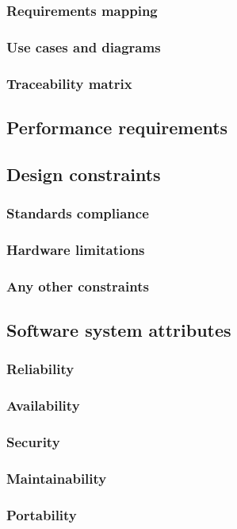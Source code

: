 \documentclass[11pt,twoside]{article}
\begin{document}
		\subsubsection{Requirements mapping}
		\subsubsection{Use cases and diagrams}
		\subsubsection{Traceability matrix}
	\subsection{Performance requirements}
	\subsection{Design constraints}
		\subsubsection{Standards compliance}
		\subsubsection{Hardware limitations}
		\subsubsection{Any other constraints}
	\subsection{Software system attributes}
		\subsubsection{Reliability}
		\subsubsection{Availability}
		\subsubsection{Security}
		\subsubsection{Maintainability}
		\subsubsection{Portability}
		
\end{document}
